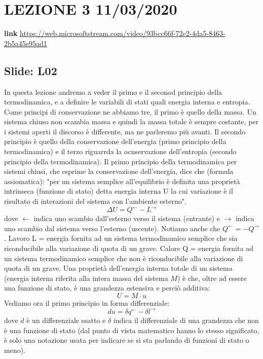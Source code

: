 \section*{LEZIONE 3 11/03/2020}
\textbf{link} \url{https://web.microsoftstream.com/video/93bcc66f-72e2-4da5-8463-2b5a45e95ad1}
\subsection*{Slide: L02}
In questa lezione andremo a veder il primo e il seconod principio della termodinamica, e a definire le variabili di stati quali energia interna e entropia.\newline
Come principi di conservazione ne abbiamo tre, il primo è quello della massa. Un sistema chiuso non scambia massa e quindi la massa totale è sempre costante, per i sistemi aperti il discorso è differente, ma ne parleremo più avanti. Il secondo principio è quello della conservazione dell'energia (primo principio della termodinamica) e il terzo riguarrda la ocnservazione dell'entropia (secondo principio della termodinamica).\newline
Il primo principio della termodinamica per sistemi chiusi, che esprime la conservazione dell'energia, dice che (formula assiomatica): "per un sistema semplice all'equilibrio è definita una proprietà intrinseca (funzione di stato) detta energia interna U la cui variazione è il risultato di interazioni del sistema con l'ambiente esterno".
\[
    \Delta U = Q^{\leftarrow} - L^{\rightarrow}
\]
dove $\leftarrow$ indica uno scambio dall'esterno verso il sistema (entrante) e $\rightarrow$ indica uno scambio dal sistema verso l'esterno (uscente).\newline
Notiamo anche che $Q^{\leftarrow} = -Q^{\rightarrow}$.
Lavoro L = energia fornita ad un sistema termodinamico semplice che sia riconducibile alla variazione di quota di un grave.\newline
Calore Q = energia fornita ad un sistema termodinamico semplice che non è riconducibile alla variazione di quota di un grave.\newline
Una proprietà dell'energia interna totale di un sistema (energia interna riferita alla intera massa del sistema $M$) è che, oltre ad essere una funzione di stato, è una grandezza estensiva e perciò additiva: 
\[
    U = M \cdot u
\]
Vediamo ora il primo principio in forma differenziale:
\[
    du =  \delta q^{\leftarrow } - \delta l^{\rightarrow }
\]
dove $d$ è un differenziale esatto e $\delta$ indica il differenziale di una grandezza che non è una funzione di stato (dal punto di vista matematico hanno lo stesso significato, è solo una notazione usata per indicare se si sta parlando di funzioni di stato o meno).\newline
